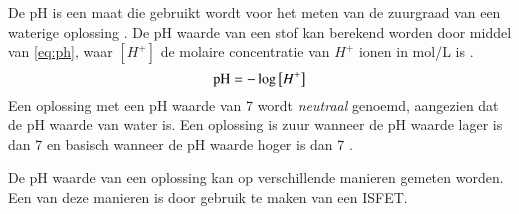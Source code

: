
De pH is een maat die gebruikt wordt voor het meten van de zuurgraad van een waterige oplossing \cite{ck12-chemistry}. De pH waarde van een stof kan berekend worden door middel van \cref{eq:ph}, waar $[H^+]$ de molaire concentratie van $H^+$ ionen in \unit{\mol/\liter} is \cite{ck12-chemistry}.
\begin{equation}\label{eq:ph}
    \mathrm{pH} = -\log\left[H^+\right]
\end{equation}
Een oplossing met een pH waarde van 7 wordt \textit{neutraal} genoemd, aangezien dat de pH waarde van water is. Een oplossing is zuur wanneer de pH waarde lager is dan 7 en basisch wanneer de pH waarde hoger is dan 7 \cite{ck12-chemistry}.

De pH waarde van een oplossing kan op verschillende manieren gemeten worden. Een van deze manieren is door gebruik te maken van een ISFET.